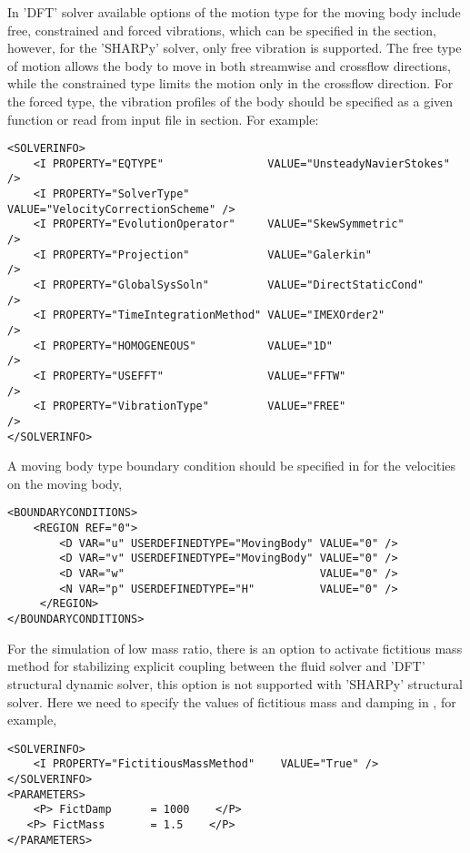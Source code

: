 In 'DFT' solver available options of the motion type for the moving body include free, constrained and forced vibrations, which can be specified in the  section, however, for the 'SHARPy' solver, only free vibration is supported. The free type of motion allows the body to move in both streamwise and crossflow directions, while the constrained type limits the motion only in the crossflow direction. For the forced type, the vibration profiles of the body should be specified as a given function or read from input file in  section. For example:

\begin{lstlisting}[style=XMLStyle]
<SOLVERINFO>
    <I PROPERTY="EQTYPE"                VALUE="UnsteadyNavierStokes"     />
    <I PROPERTY="SolverType"            VALUE="VelocityCorrectionScheme" />
    <I PROPERTY="EvolutionOperator"     VALUE="SkewSymmetric"            />
    <I PROPERTY="Projection"            VALUE="Galerkin"                 />
    <I PROPERTY="GlobalSysSoln"         VALUE="DirectStaticCond"         />
    <I PROPERTY="TimeIntegrationMethod" VALUE="IMEXOrder2"               />
    <I PROPERTY="HOMOGENEOUS"           VALUE="1D"                       />
    <I PROPERTY="USEFFT"                VALUE="FFTW"                     />
    <I PROPERTY="VibrationType"         VALUE="FREE"                     />
</SOLVERINFO>
\end{lstlisting}

A moving body type boundary condition should be specified in  for the velocities on the moving body,

\begin{lstlisting}[style=XMLStyle]
<BOUNDARYCONDITIONS>
    <REGION REF="0">
        <D VAR="u" USERDEFINEDTYPE="MovingBody" VALUE="0" />
        <D VAR="v" USERDEFINEDTYPE="MovingBody" VALUE="0" />
        <D VAR="w"                              VALUE="0" />
        <N VAR="p" USERDEFINEDTYPE="H"          VALUE="0" />
     </REGION>
</BOUNDARYCONDITIONS>
\end{lstlisting}

For the simulation of low mass ratio, there is an option to activate fictitious mass method for stabilizing explicit coupling between the fluid solver and 'DFT' structural dynamic solver, this option is not supported with 'SHARPy' structural solver. Here we need to specify the values of fictitious mass and damping in , for example,

\begin{lstlisting}[style=XMLStyle]
<SOLVERINFO>
    <I PROPERTY="FictitiousMassMethod"    VALUE="True" />
</SOLVERINFO>
<PARAMETERS>
    <P> FictDamp      = 1000    </P>
   <P> FictMass       = 1.5    </P>
</PARAMETERS>
\end{lstlisting}

